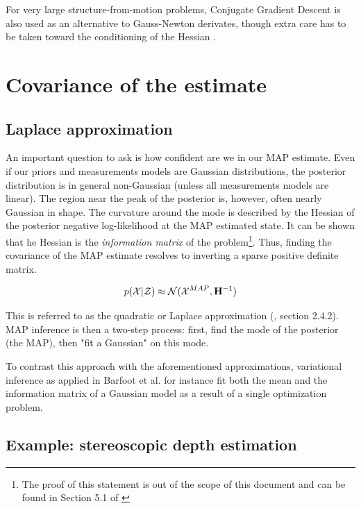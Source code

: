 For very large structure-from-motion problems, Conjugate Gradient Descent is also used as an alternative to Gauss-Newton derivates, though extra care has to 
be taken toward the conditioning of the Hessian \cite{jian2012generalized}.



\section{Covariance of the estimate}
\subsection{Laplace approximation}
\label{sec:map_covariance}
An important question to ask is how confident are we in our MAP estimate. Even if our priors and measurements models are Gaussian distributions, the posterior distribution
is in general non-Gaussian (unless all measurements models are linear). The region near the peak of the posterior is, however, often nearly Gaussian in shape.
The curvature around the mode is described by the Hessian of the posterior negative log-likelihood at the MAP estimated state. 
It can be shown that he Hessian is the \textit{information matrix} of the problem\footnote{The proof of this statement is out of the scope of this document and can be found in Section 5.1 of
\cite{peng2018advanced}}. Thus, finding the covariance of the MAP estimate resolves to inverting a 
sparse positive definite matrix.

\begin{equation}
    p(\mathcal{X} | \mathcal{Z}) \approx \mathcal{N}({\mathcal{X}^{MAP}},{{\bf H}^{-1}})
    \label{eq:map_laplace}
\end{equation}

This is referred to as the quadratic or Laplace approximation (\cite{mcelreath2018statistical}, section 2.4.2). MAP inference is then a two-step process: 
first, find the mode of the posterior (the MAP), then "fit a Gaussian" on this mode. 

To contrast this approach with the aforementioned approximations, variational inference as applied in Barfoot et al. 
 \cite{barfoot2020exactly} for instance fit both the mean and the information matrix of a Gaussian model as a result of a single optimization problem.



\subsection{Example: stereoscopic depth estimation}

